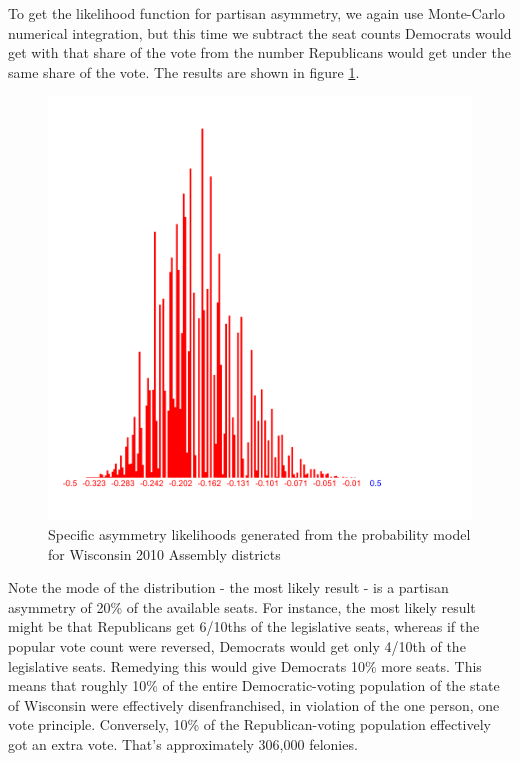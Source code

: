\documentclass[preprint,12pt]{article}
\begin{document}
To get the likelihood function for partisan asymmetry, we again use Monte-Carlo numerical integration, but this time we subtract the seat counts Democrats would get with that share of the vote from the number Republicans would get under the same share of the vote. The results are shown in figure \ref{fig:LikelihoodsAsymmetry}.
 
\begin{figure}[htb!]
    \begin{center}
        \includegraphics[scale=0.25]{../Figures/WI2010/asymmetry.png}
        \caption{Specific asymmetry likelihoods generated from the probability model for Wisconsin 2010 Assembly districts}\label{fig:LikelihoodsAsymmetry}
    \end{center}
\end{figure}
 
Note the mode of the distribution - the most likely result - is a partisan asymmetry of 20\% of the available seats.  For instance, the most likely result might be that Republicans get 6/10ths of the legislative seats, whereas if the popular vote count were reversed, Democrats would get only 4/10th of the legislative seats.  Remedying this would give Democrats 10\% more seats.  This means that roughly 10\% of the entire Democratic-voting population of the state of Wisconsin were effectively disenfranchised, in violation of the one person, one vote principle.  Conversely, 10\% of the Republican-voting population effectively got an extra vote.  That's approximately 306,000 felonies.
 
\end{document}
